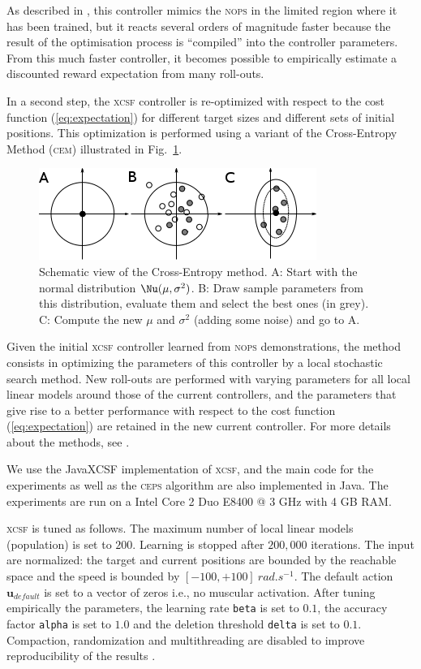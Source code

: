\documentclass[10pt]{article}
\newcommand\ops{\textsc{nops}\xspace}
\newcommand\cem{\textsc{cem}\xspace}
\newcommand\xcsf{\textsc{xcsf}\xspace}
\newcommand\ceps{\textsc{ceps}\xspace}
\newcommand{\rols}{roll-outs\xspace}
\renewcommand\vec[1]{\boldsymbol{#1}} %
\begin{document}
As described in \cite{marin11_gecco}, this controller mimics the \ops in the limited region where it has been trained, but it reacts several orders of magnitude faster because the result of the optimisation process is ``compiled'' into the controller parameters. From this much faster controller, it becomes possible to empirically estimate a discounted reward expectation from many \rols.

In a second step, the \xcsf controller is re-optimized with respect to the cost function (\ref{eq:expectation}) for different target sizes and different sets of initial positions. This optimization is performed using a variant of the Cross-Entropy Method (\cem) \cite{Rubinstein97} illustrated in Fig.~\ref{fig:cross-entropy}. 

\begin{figure}[hbt]
\centering
	\includegraphics[width=0.6\columnwidth]{images/cross-entropy_simple}
	\caption{Schematic view of the Cross-Entropy method.
A: Start with the normal distribution $\Nu(\mu,\sigma^2)$.
B: Draw sample parameters from this distribution, evaluate them and select the best ones (in grey).
C: Compute the new $\mu$ and $\sigma^2$ (adding some noise) and go to A.
	\label{fig:cross-entropy}}
\end{figure}

Given the initial \xcsf controller learned from \ops demonstrations, the method consists in optimizing the parameters of this controller by a local stochastic search method. New \rols are performed with varying parameters for all local linear models around those of the current controllers, and the parameters that give rise to a better performance with respect to the cost function (\ref{eq:expectation}) are retained in the new current controller. For more details about the methods, see \cite{marin11_gecco}.

We use the JavaXCSF \cite{Stalph2009} implementation of \xcsf, and the main code for the experiments as well as the \ceps algorithm are also implemented in Java.
The experiments are run on a Intel Core 2 Duo E8400 @ 3 GHz with 4 GB RAM.

\xcsf is tuned as follows. The maximum number of local linear models (population) is set to $200$. Learning is stopped after $200,000$ iterations. The input are normalized: the target and current positions are bounded by the reachable space and the speed is bounded by $[-100, +100]~rad.s^{-1}$. The default action $\vec{u}_{default}$ is set to a vector of zeros i.e., no muscular activation. After tuning empirically the parameters, the learning rate \texttt{beta} is set to $0.1$, the accuracy factor \texttt{alpha} is set to $1.0$ and the deletion threshold \texttt{delta} is set to $0.1$. Compaction, randomization and multithreading are disabled to improve reproducibility of the results \cite{Stalph2009}.
\end{document}
